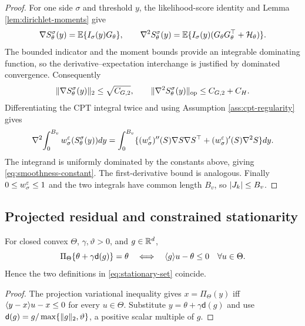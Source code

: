 \begin{proof}
For one side $\sigma$ and threshold $y$, the likelihood-score identity and Lemma \ref{lem:dirichlet-moments} give
\[
 \nabla S_\theta^\sigma(y)=\mathbb E\{I_\sigma(y)G_\theta\},
 \qquad
 \nabla^2S_\theta^\sigma(y)
 =\mathbb E\{I_\sigma(y)(G_\theta G_\theta^\top+\mathcal H_\theta)\}.
\]
The bounded indicator and the moment bounds provide an integrable dominating function, so the derivative--expectation interchange is justified by dominated convergence.  Consequently
\[
 \lVert\nabla S_\theta^\sigma(y)\rVert_2\le\sqrt{C_{G,2}},
 \qquad
 \lVert\nabla^2S_\theta^\sigma(y)\rVert_{\mathrm{op}}\le C_{G,2}+C_H.
\]
Differentiating the CPT integral twice and using Assumption \ref{ass:cpt-regularity} gives
\[
 \nabla^2\!\int_0^{B_v}w_\sigma^\varepsilon(S_\theta^\sigma(y))dy
 =\int_0^{B_v}
 \{(w_\sigma^\varepsilon)''(S)\nabla S\nabla S^\top
 +(w_\sigma^\varepsilon)'(S)\nabla^2S\}dy.
\]
The integrand is uniformly dominated by the constants above, giving \eqref{eq:smoothness-constant}.  The first-derivative bound is analogous.  Finally $0\le w_\sigma^\varepsilon\le1$ and the two integrals have common length $B_v$, so $\lvert J_k\rvert\le B_v$.
\end{proof}

\subsection{Projected residual and constrained stationarity}

\begin{lemma}\label{lem:residual-stationarity}
For closed convex $\Theta$, $\gamma,\vartheta>0$, and $g\in\mathbb R^d$,
\begin{equation}\label{eq:projection-stationarity-equivalence}
 \Pi_\Theta\{\theta+\gamma\mathsf d(g)\}=\theta
 \quad\Longleftrightarrow\quad
 \langle g\rangle{u-\theta}\le0\quad\forall u\in\Theta.
\end{equation}
Hence the two definitions in \eqref{eq:stationary-set} coincide.
\end{lemma}

\begin{proof}
The projection variational inequality gives
$x=\Pi_\Theta(y)$ iff $\langle y-x\rangle{u-x}\le0$ for every $u\in\Theta$.  Substitute $y=\theta+\gamma\mathsf d(g)$ and use
$\mathsf d(g)=g/\max\{\lVert g\rVert_2,\vartheta\}$, a positive scalar multiple of $g$.
\end{proof}
